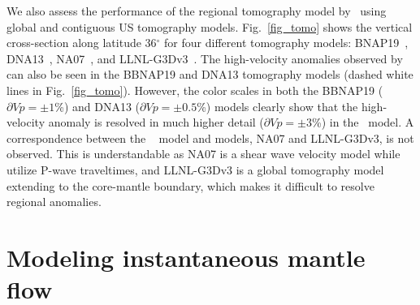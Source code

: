 \documentclass[draft,linenumbers]{agujournal2018}
\begin{document}
We also assess the performance of the regional tomography model by~\citet{Biryol_2016} using global and  contiguous US tomography models. Fig.~\ref{fig_tomo} shows the vertical cross-section along latitude 36$^\circ$ for four different tomography models: BNAP19~\citep[P-wave tomography model of the continental US concentrating on the upper mantle structure by][]{boyce2019variable}, DNA13~\citep[P-wave and S-wave velocity model for the contiguous US by][]{porritt2014seismic}, NA07~\citep[S-wave velocity model of the upper mantle in North America by][]{bedle2009s}, and LLNL-G3Dv3~\citep[Global P-wave tomography model by][]{simmons2012llnl}. The high-velocity anomalies observed by~\citet{Biryol_2016} can also be seen in the BBNAP19 and DNA13 tomography models (dashed white lines in Fig.~\ref{fig_tomo}). However, the color scales in both the BBNAP19 ($\partial Vp=\pm1$\%) and DNA13 ($\partial Vp=\pm0.5$\%) models clearly show that the high-velocity anomaly is resolved in much higher detail ($\partial Vp=\pm3$\%) in the~\citet{Biryol_2016} model. A correspondence between the ~\citet{Biryol_2016} model and models, NA07 and LLNL-G3Dv3, is not observed. This is understandable as NA07 is a shear wave velocity model while~\citet{Biryol_2016} utilize P-wave traveltimes, and  LLNL-G3Dv3 is a global tomography model extending to the core-mantle boundary, which makes it difficult to resolve regional anomalies. 


\section{Modeling instantaneous mantle flow}
    
\end{document}
